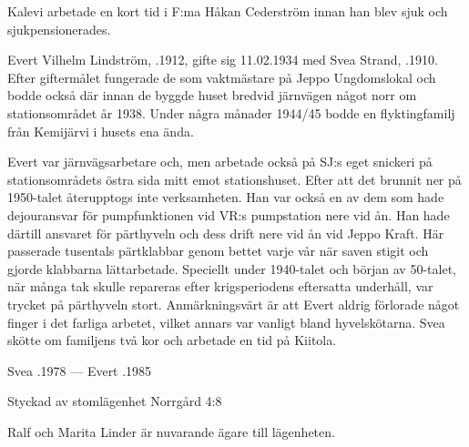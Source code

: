 Kalevi arbetade en kort tid i F:ma Håkan Cederström innan han blev sjuk och sjukpensionerades.
\begin{jhchildren}
  \item {}
  \item {}
  \item {}
\end{jhchildren}


Evert Vilhelm Lindström, .1912, gifte sig 11.02.1934 med Svea Strand, .1910. Efter giftermålet fungerade de som vaktmästare på Jeppo Ungdomslokal och bodde också där innan de byggde huset bredvid järnvägen något norr om stationsområdet år 1938. Under några månader 1944/45 bodde en flyktingfamilj från Kemijärvi i husets ena ända.

Evert var järnvägsarbetare och, men arbetade också på SJ:s eget snickeri på stationsområdets östra sida mitt emot stationshuset. Efter att det brunnit ner på 1950-talet återupptogs inte verksamheten. Han var också en av dem som hade dejouransvar för pumpfunktionen vid VR:s pumpstation nere vid ån. Han hade därtill ansvaret för pärthyveln och dess drift nere vid ån vid Jeppo Kraft. Här passerade tusentals pärtklabbar genom bettet varje vår när saven stigit och gjorde klabbarna lättarbetade. Speciellt under 1940-talet och början av 50-talet, när många tak skulle repareras efter krigsperiodens eftersatta underhåll, var trycket på pärthyveln stort. Anmärkningsvärt är att Evert aldrig förlorade något finger i det farliga arbetet, vilket annars var vanligt bland hyvelskötarna. Svea skötte om familjens två kor och  arbetade en tid på Kiitola.
\begin{jhchildren}
  \item {}
  \item {}
\end{jhchildren}

Svea .1978  ---  Evert .1985



Styckad av stomlägenhet Norrgård 4:8

Ralf och Marita Linder är nuvarande ägare till lägenheten.\jhvspace{}


